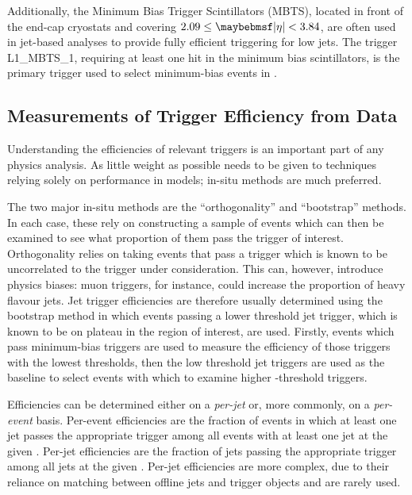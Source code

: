 Additionally, the Minimum Bias Trigger Scintillators (MBTS), located in front of
the end-cap cryostats and covering $2.09 \leq \absEta < 3.84$, are often used in jet-based
analyses to provide fully efficient triggering for low \pT jets. The trigger
L1\_MBTS\_1, requiring at least one hit in the minimum bias scintillators, is
the primary trigger used to select minimum-bias events in \ATLAS.

\subsection{Measurements of Trigger Efficiency from Data}
Understanding the efficiencies of relevant triggers is an important part of any
physics analysis. As little weight as possible needs to be given to techniques
relying solely on performance in \MC models; in-situ methods are much preferred.

The two major in-situ methods are the ``orthogonality'' and ``bootstrap''
methods. In each case, these rely on constructing a sample of events which can
then be examined to see what proportion of them pass the trigger of interest.
Orthogonality relies on taking events that pass a trigger which is known to be
uncorrelated to the trigger under consideration. This can, however, introduce physics
biases: muon triggers, for instance, could increase the proportion of
heavy flavour jets. Jet trigger efficiencies are therefore usually determined
using the bootstrap method in which events passing a lower threshold jet trigger,
which is known to be on plateau in the \pT region of interest, are used. Firstly,
events which pass minimum-bias triggers are used to measure the efficiency of
those triggers with the lowest \pT thresholds, then the low threshold jet
triggers are used as the baseline to select events with which to examine higher
\pT-threshold triggers.

Efficiencies can be determined either on a \emph{per-jet} or, more commonly, on
a \emph{per-event} basis. Per-event efficiencies are the fraction of events in
which at least one jet passes the appropriate trigger among all events with at
least one jet at the given \pT. Per-jet efficiencies are the fraction of jets
passing the appropriate trigger among all jets at the given \pT. Per-jet
efficiencies are more complex, due to their reliance on matching between offline
jets and trigger objects and are rarely used.

